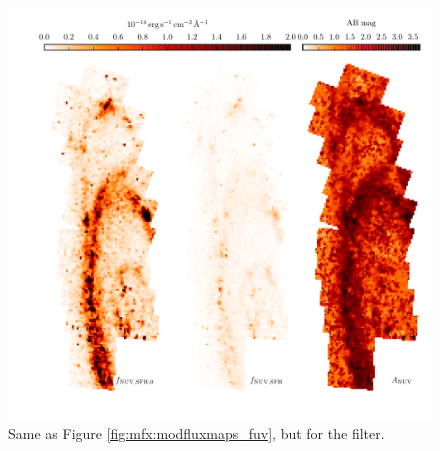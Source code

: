 \begin{figure}
\centering
\includegraphics[width=\textwidth]{m31flux-figures/modfluxmaps_nuv.pdf}
\caption[\nuv{} flux map modeled from the SFHs.]{Same as Figure
    \ref{fig:mfx:modfluxmaps_fuv}, but for the \nuv{} filter.
}
\label{fig:mfx:modfluxmaps_nuv}
\end{figure}

%
%





